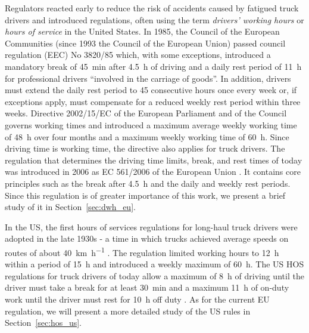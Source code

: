 Regulators reacted early to reduce the risk of accidents caused by fatigued truck drivers and introduced regulations, often using the term \emph{drivers' working hours} or \emph{hours of service} in the United States. In 1985, the Council of the European Communities (since 1993 the Council of the European Union) passed council regulation (EEC) No 3820/85 \cite{counciloftheeuropeancommunities:1985} which, with some exceptions, introduced a mandatory break of \SI{45}{\minute} after \SI{4.5}{\hour} of driving and a daily rest period of \SI{11}{\hour} for professional drivers ``involved in the carriage of goods''. In addition, drivers must extend the daily rest period to \si{45} consecutive hours once every week or, if exceptions apply, must compensate for a reduced weekly rest period within three weeks. Directive 2002/15/EC \cite{europeanparliament:2002} of the European Parliament and of the Council governs working times and introduced a maximum average weekly working time of \SI{48}{\hour} over four months and a maximum weekly working time of \SI{60}{\hour}. Since driving time is working time, the directive also applies for truck drivers. The regulation that determines the driving time limits, break, and rest times of today was introduced in 2006 as EC 561/2006 of the European Union \cite{europeanparliament:2006}. It contains core principles such as the break after \SI{4.5}{\hour} and the daily and weekly rest periods. Since this regulation is of greater importance of this work, we present a brief study of it in Section~\ref{sec:dwh_eu}.

In the US, the first hours of services regulations for long-haul truck drivers were adopted in the late 1930s - a time in which trucks achieved average speeds on routes of about \SI[per-mode = symbol]{40}{\km\per\hour} \cite{federalmotorcarriersafetyadministrationfmcsa:2000}. The regulation limited working hours to \SI{12}{\hour} within a period of \SI{15}{\hour} and introduced a weekly maximum of \SI{60}{\hour}. The US HOS regulations for truck drivers of today allow a maximum of \SI{8}{\hour} of driving until the driver must take a break for at least \SI{30}{\minute} and a maximum \SI{11}{\hour} of on-duty work until the driver must rest for \SI{10}{\hour} off duty \cite{federalmotorcarriersafetyadministrationfmcsa:2011}. As for the current EU regulation, we will present a more detailed study of the US rules in Section~\ref{sec:hos_us}.

